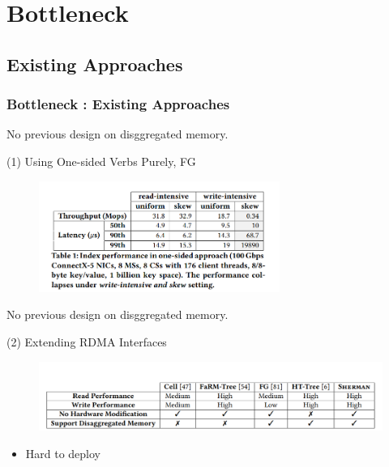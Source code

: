 \documentclass[11pt]{beamer}                                                                                                   %
\begin{document}
\section{Bottleneck}
\subsection{Existing Approaches}
\begin{frame}[fragile]
	\frametitle{Bottleneck : Existing Approaches}
	No previous design on disggregated memory.
	
	(1) Using One-sided Verbs Purely, FG
		\begin{figure}[ht]%
		\centering  %
		\includegraphics[width=0.7\textwidth]{08.png}  
		
	\end{figure}
\end{frame}
\begin{frame}[t]
	No previous design on disggregated memory.
	
	(2) Extending RDMA Interfaces
	\begin{figure}[ht]%
		\centering  %
		\includegraphics[width=1\textwidth]{09.png}  
		
	\end{figure}
			\begin{itemize}
		\item Hard to deploy
	\end{itemize}
\end{frame}
\end{document}
